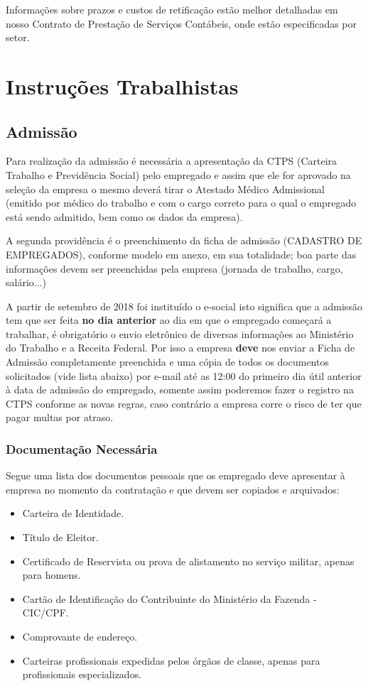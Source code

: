\documentclass{article}
\begin{document}
Informações sobre prazos e custos de retificação estão melhor detalhadas em nosso Contrato de Prestação de Serviços Contábeis, onde estão especificadas por setor.

\pagebreak
\section{Instruções Trabalhistas}
\label{sec:ins-trabs}
\subsection{Admissão}
\label{ins:adm}
Para realização da admissão é necessária a apresentação da CTPS (Carteira Trabalho e Previdência Social) pelo empregado e assim que ele for aprovado na seleção da empresa o mesmo deverá tirar o Atestado Médico Admissional (emitido por médico do trabalho e com o cargo correto para o qual o empregado está sendo admitido, bem como os dados da empresa).

A segunda providência é o preenchimento da ficha de admissão (CADASTRO DE EMPREGADOS), conforme modelo em anexo, em sua totalidade; boa parte das informações devem ser preenchidas pela empresa (jornada de trabalho, cargo, salário...)

\begin{tcolorbox}[title=Atenção!]
  A partir de setembro de 2018 foi instituído o e-social isto significa que a admissão tem que ser feita \textbf{no dia anterior} ao dia em que o empregado começará a trabalhar, é obrigatório o  envio eletrônico de diversas informações ao Ministério do Trabalho e a Receita Federal. Por isso a empresa \textbf{deve} nos enviar a Ficha de Admissão completamente preenchida e uma cópia de todos os documentos solicitados (vide lista abaixo) por e-mail até as 12:00 do primeiro dia útil anterior à data de admissão do empregado, somente assim poderemos fazer o registro na CTPS conforme as novas regras, caso contrário a empresa corre o risco de ter que pagar multas por atraso.
\end{tcolorbox}
\subsubsection{Documentação Necessária}
\label{adm:docs}
Segue uma lista dos documentos pessoais que os empregado deve apresentar à empresa no momento da contratação e que devem ser copiados e arquivados:
\begin{itemize}
  \item Carteira de Identidade.
  \item Título de Eleitor.
  \item Certificado de Reservista ou prova de alistamento no serviço militar, apenas para homens.
  \item Cartão de Identificação do Contribuinte do Ministério da Fazenda - CIC/CPF.
  \item Comprovante de endereço.
  \item Carteiras profissionais expedidas pelos órgãos de classe, apenas para profissionais especializados.
\end{itemize}
\end{document}
